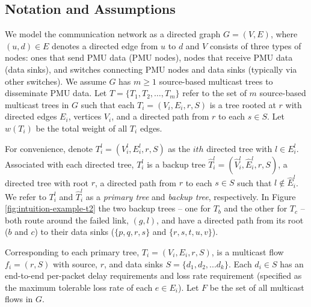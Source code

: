 \subsection{Notation and Assumptions}
\label{subsec:notation}


We model the communication network as a directed graph $G=(V,E)$, where $(u,d) \in E$ denotes a directed edge from $u$ to $d$ and 
$V$ consists of three types of nodes: ones that send PMU data (PMU nodes), nodes that receive PMU data (data sinks), and switches connecting PMU nodes and data sinks (typically via other switches).
We assume $G$ has $m\geq1$ source-based multicast trees to disseminate PMU data.   Let $T=\{T_1,T_2, \dots ,T_m\}$ refer to the set of $m$ source-based multicast trees in $G$
such that each $T_i = (V_i,E_i,r,S)$ is a tree rooted at $r$ with directed edges $E_i$, vertices $V_i$, and a directed path from $r$ to each $s \in S$.  Let $w(T_i)$ be the total weight of 
all $T_i$ edges.

For convenience, denote $T^l_i = (V^l_i,E^l_i,r,S)$ as the $ith$ directed tree with $l \in E^l_i$.  Associated with each directed tree, $T^l_i$ is a backup tree 
$\hat{T}^l_i=(\hat{V}^l_i,\hat{E}^l_i,r,S)$, a directed tree with root $r$, a directed path from $r$ to each $s \in S$ such that $l \notin \hat{E}^l_i$.  
We refer to  $T^l_i$ and $\hat{T}^l_i$ as a {\em primary tree} and {\em backup tree}, respectively.  In Figure \ref{fig:intuition-example-t2} the two backup trees -- one for $T_b$ and the other for
$T_c$ -- both route around the failed link, $(g,l)$, and have a directed path from its root ($b$ and $c$) to their data sinks ($\{p,q,r,s\}$ and $\{r,s,t,u,v\}$).



Corresponding to each primary tree, $T_i = (V_i,E_i,r,S)$, is a multicast flow $f_i =(r,S)$ with source, $r$, and data sinks $S=\{d_1, d_2, ... d_k\}$. Each $d_i \in S$ has an end-to-end per-packet
delay requirements and loss rate requirement (specified as the maximum tolerable loss rate of each $e \in E_i$).
Let $F$ be the set of all multicast flows in $G$. 

